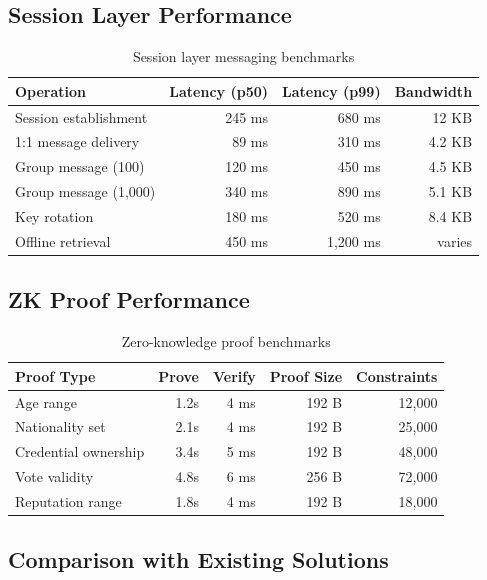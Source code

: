 \documentclass[11pt,a4paper]{article}
\begin{document}
\subsection{Session Layer Performance}

\begin{table}[H]
\centering
\caption{Session layer messaging benchmarks}
\label{tab:session_bench}
\begin{tabular}{lrrr}
\toprule
\textbf{Operation} & \textbf{Latency (p50)} & \textbf{Latency (p99)} & \textbf{Bandwidth} \\
\midrule
Session establishment & 245 ms & 680 ms & 12 KB \\
1:1 message delivery & 89 ms & 310 ms & 4.2 KB \\
Group message (100) & 120 ms & 450 ms & 4.5 KB \\
Group message (1{,}000) & 340 ms & 890 ms & 5.1 KB \\
Key rotation & 180 ms & 520 ms & 8.4 KB \\
Offline retrieval & 450 ms & 1{,}200 ms & varies \\
\bottomrule
\end{tabular}
\end{table}

\subsection{ZK Proof Performance}

\begin{table}[H]
\centering
\caption{Zero-knowledge proof benchmarks}
\label{tab:zk_bench}
\begin{tabular}{lrrrr}
\toprule
\textbf{Proof Type} & \textbf{Prove} & \textbf{Verify} & \textbf{Proof Size} & \textbf{Constraints} \\
\midrule
Age range & 1.2s & 4 ms & 192 B & 12{,}000 \\
Nationality set & 2.1s & 4 ms & 192 B & 25{,}000 \\
Credential ownership & 3.4s & 5 ms & 192 B & 48{,}000 \\
Vote validity & 4.8s & 6 ms & 256 B & 72{,}000 \\
Reputation range & 1.8s & 4 ms & 192 B & 18{,}000 \\
\bottomrule
\end{tabular}
\end{table}

\subsection{Comparison with Existing Solutions}
\end{document}

